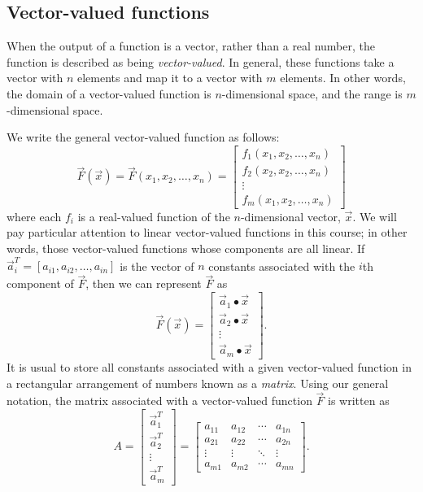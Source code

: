 \documentclass[../book.tex]{subfiles}
\begin{document}
\subsection{Vector-valued functions}

When the output of a function is a vector, rather than a real number, the function is described as being \emph{vector-valued}. In general, these functions take a vector with \(n\) elements and map it to a vector with \(m\) elements. In other words, the domain of a vector-valued function is \(n\)-dimensional space, and the range is \(m\)-dimensional space.

We write the general vector-valued function as follows:
\begin{equation}\label{eq:vec-24}
\vec{F}(\vec{x})
=
\vec{F} ( x_1, x_2, \ldots, x_n)
=
\begin{bmatrix}
  f_1 (x_1, x_2, \ldots, x_n) \\
  f_2 (x_2, x_2, \ldots, x_n) \\
  \vdots\\
  f_m (x_1, x_2, \ldots, x_n)
\end{bmatrix}
\end{equation}
where each \(f_i\) is a real-valued function of the \(n\)-dimensional vector, \(\vec{x}\). We will pay particular attention to linear vector-valued functions in this course; in other words, those vector-valued functions whose components are all linear. If \(\vec{a}_i^{ T} = [a_{i1}, a_{i2}, \ldots, a_{in}]\) is the vector of \(n\) constants associated with the \(i\)th component of \(\vec{F}\), then we can represent \(\vec{F}\) as
\begin{equation}\label{eq:vec-25}
\vec{F}(\vec{x})
=
\begin{bmatrix}
  \vec{a}_1 \bullet \vec{x} \\
  \vec{a}_2 \bullet \vec{x} \\
  \vdots \\
  \vec{a}_m \bullet \vec{x}
\end{bmatrix}.
\end{equation}
It is usual to store all constants associated with a given vector-valued function in a rectangular arrangement of numbers known as a \emph{matrix}. Using our general notation, the matrix associated with a vector-valued function \(\vec{F}\) is written as
\begin{equation}\label{eq:vec-26}
A
=
\begin{bmatrix}
  \vec{a}_1^{ T} \\
  \vec{a}_2^{ T} \\
  \vdots \\
  \vec{a}_m^{ T}
\end{bmatrix}
=
\begin{bmatrix}
  a_{11} & a_{12} & \cdots & a_{1n} \\
  a_{21} & a_{22} & \cdots & a_{2n} \\
  \vdots & \vdots &\ddots & \vdots \\
  a_{m1} & a_{m2} & \cdots & a_{mn} 
\end{bmatrix}.
\end{equation}
\end{document}
